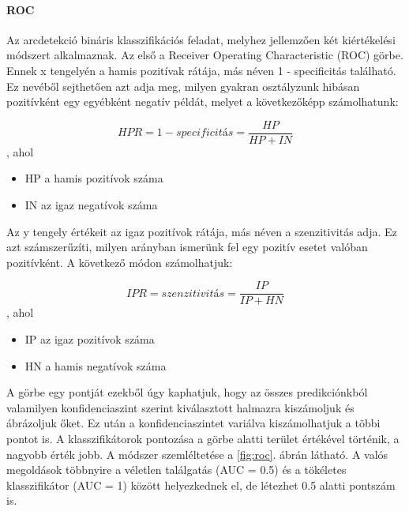 \paragraph{ROC}\hfill

Az arcdetekció bináris klasszifikációs feladat, melyhez jellemzően két kiértékelési módszert alkalmaznak. Az első a Receiver Operating Characteristic (ROC) görbe. Ennek x tengelyén a hamis pozitívak rátája, más néven 1 - specificitás található. Ez nevéből sejthetően azt adja meg, milyen gyakran osztályzunk hibásan pozitívként egy egyébként negatív példát, melyet a következőképp számolhatunk:

\begin{equation}
    HPR = 1 - specificitás = \frac{HP}{HP + IN}
\end{equation},
ahol
\begin{itemize}
    \item HP a hamis pozitívok száma
    \item IN az igaz negatívok száma
\end{itemize}

Az y tengely értékeit az igaz pozitívok rátája, más néven a szenzitivitás adja. Ez azt számszerűzíti, milyen arányban ismerünk fel egy pozitív esetet valóban pozitívként. A következő módon számolhatjuk:

\begin{equation}
    IPR = szenzitivitás = \frac{IP}{IP + HN}
\end{equation},
ahol
\begin{itemize}
    \item IP az igaz pozitívok száma
    \item HN a hamis negatívok száma
\end{itemize}
A görbe egy pontját ezekből úgy kaphatjuk, hogy az összes predikciónkból valamilyen konfidenciaszint szerint kiválasztott halmazra kiszámoljuk és ábrázoljuk őket. Ez után a konfidenciaszintet variálva kiszámolhatjuk a többi pontot is. A klasszifikátorok pontozása a görbe alatti terület értékével történik, a nagyobb érték jobb. A módszer szemléltetése a \ref{fig:roc}. ábrán látható. A valós megoldások többnyire a véletlen találgatás (AUC = 0.5) és a tökéletes klasszifikátor (AUC = 1) között helyezkednek el, de létezhet 0.5 alatti pontszám is.


